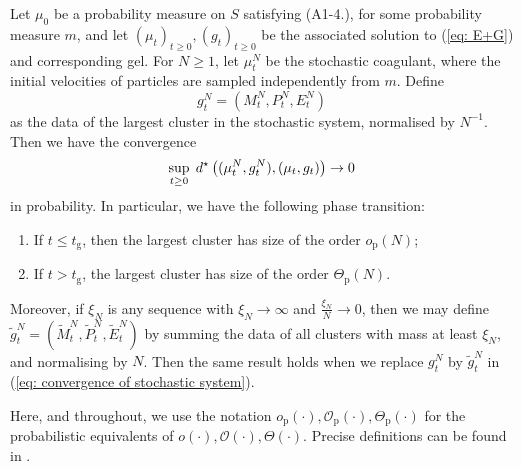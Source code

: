 \begin{theorem} \label{thrm: convergence of stochastic coagulent} Let $\mu_0$ be a probability measure on $S$ satisfying ({A1-4}.), for some probability measure $m$, and let $(\mu_t)_{t\ge 0}, (g_t)_{t\ge 0}$ be the associated solution to (\ref{eq: E+G}) and corresponding gel. For $N\ge 1$, let $\mu^N_t$ be the stochastic coagulant, where the initial velocities of particles are sampled independently from $m$. Define \begin{equation} g^N_t=(M^N_t, P^N_t, E^N_t)\end{equation}  as the data of the largest cluster in the stochastic system, normalised by $N^{-1}$. Then we have the convergence \begin{equation} \label{eq: convergence of stochastic system}
    \sup_{t\ge 0}\hspace{0.1cm}d^\star\left((\mu^N_t, g^N_t),(\mu_t, g_t)\right) \rightarrow 0
\end{equation} in probability. In particular, we have the following phase transition: \begin{enumerate}[label=\roman{*}).]
    \item If $t\le t_\mathrm{g}$, then the largest cluster has size of the order $o_\mathrm{p}(N)$;
    \item If $t>t_\mathrm{g}$, the largest cluster has size of the order $\Theta_\mathrm{p}(N)$.
\end{enumerate} 

Moreover, if $\xi_N$ is any sequence with $\xi_N\rightarrow \infty$ and $\frac{\xi_N}{N}\rightarrow 0$, then we may define $\widetilde{g}^N_t=(\widetilde{M}^N_t, \widetilde{P}^N_t, \widetilde{E}^N_t)$ by summing the data of all clusters with mass at least $\xi_N$, and normalising by $N$. Then the same result holds when we replace $g^N_t$ by $\widetilde{g}^N_t$ in (\ref{eq: convergence of stochastic system}).
\end{theorem} 

Here, and throughout, we use the notation $o_\mathrm{p}(\cdot), \mathcal{O}_\mathrm{p}(\cdot), \Theta_\mathrm{p}(\cdot)$ for the probabilistic equivalents of $o(\cdot), \mathcal{O}(\cdot), \Theta(\cdot)$. Precise definitions can be found in \cite{JLR}.

